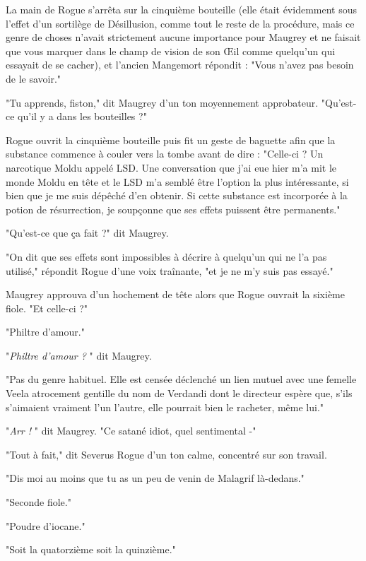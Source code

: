 La main de Rogue s'arrêta sur la cinquième bouteille (elle était évidemment sous l'effet d'un sortilège de Désillusion, comme tout le reste de la procédure, mais ce genre de choses n'avait strictement aucune importance pour Maugrey et ne faisait que vous marquer dans le champ de vision de son Œil comme quelqu'un qui essayait de se cacher), et l'ancien Mangemort répondit : "Vous n'avez pas besoin de le savoir."

"Tu apprends, fiston," dit Maugrey d'un ton moyennement approbateur. "Qu'est-ce qu'il y a dans les bouteilles ?"

Rogue ouvrit la cinquième bouteille puis fit un geste de baguette afin que la substance commence à couler vers la tombe avant de dire : "Celle-ci ? Un narcotique Moldu appelé LSD. Une conversation que j'ai eue hier m'a mit le monde Moldu en tête et le LSD m'a semblé être l'option la plus intéressante, si bien que je me suis dépêché d'en obtenir. Si cette substance est incorporée à la potion de résurrection, je soupçonne que ses effets puissent être permanents."

"Qu'est-ce que ça fait ?" dit Maugrey.

"On dit que ses effets sont impossibles à décrire à quelqu'un qui ne l'a pas utilisé," répondit Rogue d'une voix traînante, "et je ne m'y suis pas essayé."

Maugrey approuva d'un hochement de tête alors que Rogue ouvrait la sixième fiole. "Et celle-ci ?"

"Philtre d'amour."

"\emph{Philtre d'amour ?} " dit Maugrey.

"Pas du genre habituel. Elle est censée déclenché un lien mutuel avec une femelle Veela atrocement gentille du nom de Verdandi dont le directeur espère que, s'ils s'aimaient vraiment l'un l'autre, elle pourrait bien le racheter, même lui."

"\emph{Arr ! } " dit Maugrey. "Ce satané idiot, quel sentimental -"

"Tout à fait," dit Severus Rogue d'un ton calme, concentré sur son travail.

"Dis moi au moins que tu as un peu de venin de Malagrif là-dedans."

"Seconde fiole."

"Poudre d'iocane."

"Soit la quatorzième soit la quinzième."


